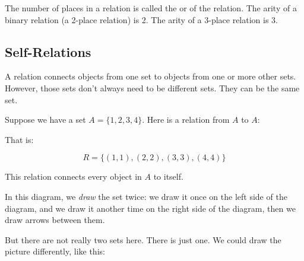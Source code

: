 \documentclass[../../../main.tex]{subfiles}
\begin{document}
The number of places in a relation is called the  or  of the relation. The arity of a binary relation (a 2-place relation) is 2. The arity of a 3-place relation is 3. 


\subsection{Self-Relations}

A relation connects objects from one set to objects from one or more other sets. However, those sets don't always need to be different sets. They can be the same set.

Suppose we have a set $A = \{ 1, 2, 3, 4 \}$. Here is a relation from $A$ to $A$:

\begin{center}
\end{center}

\noindent
That is:

\begin{equation*}
R = \{ (1, 1), (2, 2), (3, 3), (4, 4) \}
\end{equation*}

\noindent
This relation connects every object in $A$ to itself. 

In this diagram, we \textit{draw} the set twice: we draw it once on the left side of the diagram, and we draw it another time on the right side of the diagram, then we draw arrows between them.

But there are not really two sets here. There is just one. We could draw the picture differently, like this:

\begin{center}\end{center}
\end{document}
